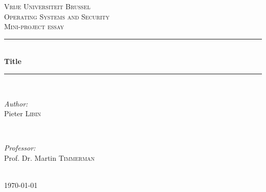 \documentclass[12pt]{report}
\begin{document}

\begin{titlepage}

\newcommand{\HRule}{\rule{\linewidth}{0.5mm}} %

\center %

\textsc{\LARGE Vrije Universiteit Brussel}\\[1.5cm] 
\textsc{\Large Operating Systems and Security}\\[0.5cm] 
\textsc{\large Mini-project essay}\\[0.5cm] 

\HRule \\[0.4cm]
{ \huge \bfseries Title}\\[0.4cm] %
\HRule \\[1.5cm]

\begin{minipage}{0.4\textwidth}
\begin{flushleft} \large
\emph{Author:}\\
Pieter \textsc{Libin} %
\end{flushleft}
\end{minipage}
~
\begin{minipage}{0.4\textwidth}
\begin{flushright} \large
\emph{Professor:} \\
Prof. Dr. Martin \textsc{Timmerman} 
\end{flushright}
\end{minipage}\\[4cm]

{\large \today}\\[3cm] %


\vfill %

\end{titlepage}


\newcommand{\treeroot}[1]{%
\node[above] at (0,0) {#1};%
\setcounter{treeline}{0}
}
\end{document}
